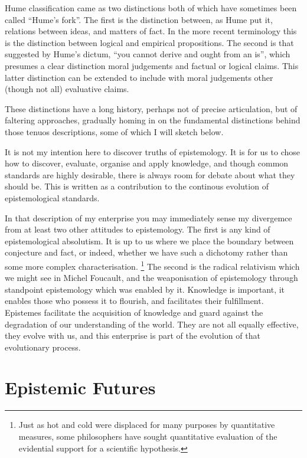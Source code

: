 \documentclass[10pt,titlepage]{article}
\begin{document}
Hume classification came as two distinctions both of which have sometimes been called ``Hume's fork''.
The first is the distinction between, as Hume put it, relations between ideas, and matters of fact.
In the more recent terminology this is the distinction between logical and empirical propositions.
The second is that suggested by Hume's dictum, ``you cannot derive and ought from an is'', which presumes a clear distinction moral judgements and factual or logical claims.
This latter distinction can be extended to include with moral judgements other (though not all) evaluative claims.

These distinctions have a long history, perhaps not of precise articulation, but of faltering approaches, gradually homing in on the fundamental distinctions behind those tenuos descriptions, some of which I will sketch below.

It is not my intention here to discover truths of epistemology.
It is for us to chose how to discover, evaluate, organise and apply knowledge, and though common standards are highly desirable, there is always room for debate about what they should be.
This is written as a contribution to the continous evolution of epistemological standards.

In that description of my enterprise you may immediately sense my divergemce from at least two other attitudes to epistemology.
The first is any kind of epistemological absolutism.
It is up to us where we place the boundary between conjecture and fact, or indeed, whether we have such a dichotomy rather than some more complex characterisation.
\footnote{Just as hot and cold were displaced for many purposes by quantitative measures, some philosophers have sought quantitative evaluation of the evidential support for a scientific hypothesis.}
The second is the radical relativism which we might see in Michel Foucault, and the weaponisation of epistemology through standpoint epistemology which was enabled by it.
Knowledge is important, it enables those who possess it to flourish, and facilitates their fulfillment.
Epistemes facilitate the acquisition of knowledge and guard against the degradation of our understanding of the world.
They are not all equally effective, they evolve with us, and this enterprise is part of the evolution of that evolutionary process.

\section{Epistemic Futures}
\end{document}
